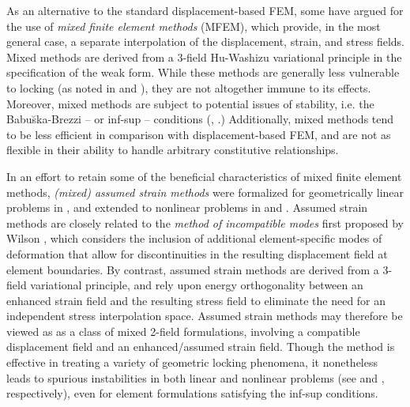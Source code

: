 		As an alternative to the standard displacement-based FEM, some have argued for the use of \textit{mixed finite element methods} (MFEM), which provide, in the most general case, a separate interpolation of the displacement, strain, and stress fields. Mixed methods are derived from a 3-field Hu-Washizu variational principle in the specification of the weak form. While these methods are generally less vulnerable to locking (as noted in \cite{Babuska&Suri:92:2} and \cite{Babuska&Suri:92:1}), they are not altogether immune to its effects. Moreover, mixed methods are subject to potential issues of stability, i.e. the Babu\u{s}ka-Brezzi -- or inf-sup -- conditions (\cite{Babuska:71}, \cite{Brezzi:74}.) Additionally, mixed methods tend to be less efficient in comparison with displacement-based FEM, and are not as flexible in their ability to handle arbitrary constitutive relationships.
		
		In an effort to retain some of the beneficial characteristics of mixed finite element methods, \textit{(mixed) assumed strain methods} were formalized for geometrically linear problems in \cite{Simo&Rifai:90}, and extended to nonlinear problems in \cite{Simo&Armero:92} and \cite{Simo&Armero&Taylor:93}. Assumed strain methods are closely related to the \textit{method of incompatible modes} first proposed by Wilson \cite{Wilson:73}, which considers the inclusion of additional element-specific modes of deformation that allow for discontinuities in the resulting displacement field at element boundaries. By contrast, assumed strain methods are derived from a 3-field variational principle, and rely upon energy orthogonality between an enhanced strain field and the resulting stress field to eliminate the need for an independent stress interpolation space. Assumed strain methods may therefore be viewed as as a class of mixed 2-field formulations, involving a compatible displacement field and an enhanced/assumed strain field. Though the method is effective in treating a variety of geometric locking phenomena, it nonetheless leads to spurious instabilities in both linear and nonlinear problems (see \cite{Bathe&Sussman:14} and \cite{Bathe&Pantuso:97}, respectively), even for element formulations satisfying the inf-sup conditions.
			
